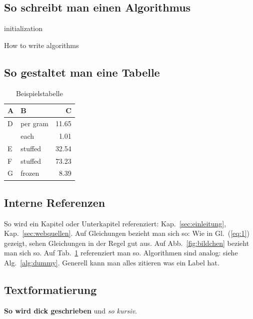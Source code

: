 \documentclass[12pt,oneside]{article}
\begin{document}
\subsection{So schreibt man einen Algorithmus}

\begin{algorithm}[H]
 initialization\;
 \caption{How to write algorithms\label{alg:dummy}
 }
\end{algorithm}

\subsection{So gestaltet man eine Tabelle}

\begin{table}[H]
\caption{Beispielstabelle\label{tab:beispiel}
}
\centering
\begin{tabular}{llr}
\hline
A    & B & C \\
\hline
D      & per gram    & 11.65      \\
          & each        & 1.01       \\
E       & stuffed     & 32.54      \\
F       & stuffed     & 73.23      \\
G & frozen      & 8.39       \\
\hline
\end{tabular}
\end{table}


\subsection{Interne Referenzen}
So wird ein Kapitel oder Unterkapitel referenziert: Kap.~\ref{sec:einleitung},
Kap.~\ref{sec:webquellen}. Auf Gleichungen bezieht man sich so: Wie in Gl.~(\ref{eq:1}) gezeigt,
sehen Gleichungen in der Regel gut aus. Auf Abb.~\ref{fig:bildchen} bezieht man sich so. Auf
Tab.~\ref{tab:beispiel} referenziert man so. Algorithmen sind analog: siehe Alg.~\ref{alg:dummy}.
Generell kann man alles zitieren was ein Label hat.


\subsection{Textformatierung}
\textbf{So wird dick geschrieben} und \textit{so kursiv}.
\end{document}
